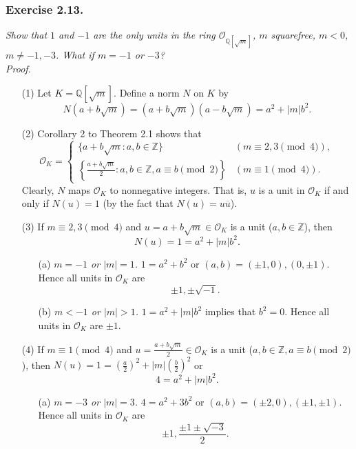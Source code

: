 \documentclass{article}
\begin{document}



\subsubsection*{Exercise 2.13.}
\emph{Show that $1$ and $-1$ are the only units in the ring
$\mathcal{O}_{\mathbb{Q}[\sqrt{m}]}$, $m$ squarefree, $m < 0$,
$m \neq -1, -3$.
What if $m = -1$ or $-3$?} \\

\emph{Proof.}
\begin{enumerate}
\item[(1)]
  Let $K = \mathbb{Q}[\sqrt{m}]$.
  Define a norm $N$ on $K$
  by $$N(a+b\sqrt{m}) = (a+b\sqrt{m})(a-b\sqrt{m}) = a^2 + |m|b^2.$$

\item[(2)]
  Corollary 2 to Theorem 2.1 shows that
  \begin{equation*}
    \mathcal{O}_K =
      \begin{cases}
        \{ a+b\sqrt{m} : a,b \in \mathbb{Z} \}
          & (m \equiv 2,3 \pmod{4}), \\
        \left\{ \frac{a+b\sqrt{m}}{2} : a,b \in \mathbb{Z}, a \equiv b \pmod{2} \right\}
          & (m \equiv 1 \pmod{4}).
      \end{cases}
  \end{equation*}
  Clearly, $N$ maps $\mathcal{O}_K$ to nonnegative integers.
  That is, $u$ is a unit in $\mathcal{O}_K$ if and only if $N(u) = 1$
  (by the fact that $N(u) = u \overline{u}$).

\item[(3)]
  If $m \equiv 2,3 \pmod{4}$ and $u = a + b\sqrt{m} \in \mathcal{O}_K$ is a unit
  ($a, b \in \mathbb{Z}$),
  then $$N(u) = 1 = a^2 + |m|b^2.$$
    \begin{enumerate}
    \item[(a)]
      \emph{$m = -1$ or $|m| = 1$.}
      $1 = a^2 + b^2$ or $(a,b) = (\pm 1,0), (0, \pm 1)$.
      Hence all units in $\mathcal{O}_K$ are
      $$\pm 1, \pm \sqrt{-1}.$$

    \item[(b)]
      \emph{$m < -1$ or $|m| > 1$.}
      $1 = a^2 + |m|b^2$ implies that $b^2 = 0$.
      Hence all units in $\mathcal{O}_K$ are $\pm 1$.
    \end{enumerate}

\item[(4)]
  If $m \equiv 1 \pmod{4}$ and $u = \frac{a + b\sqrt{m}}{2} \in \mathcal{O}_K$ is a unit
  ($a, b \in \mathbb{Z}, a \equiv b \pmod{2}$),
  then $N(u) = 1 = (\frac{a}{2})^2 + |m|(\frac{b}{2})^2$ or
  $$4 = a^2 + |m|b^2.$$
    \begin{enumerate}
    \item[(a)]
      \emph{$m = -3$ or $|m| = 3$.}
      $4 = a^2 + 3b^2$ or $(a,b) = (\pm 2,0), (\pm 1, \pm 1)$.
      Hence all units in $\mathcal{O}_K$ are
      $$\pm 1, \frac{\pm 1 \pm \sqrt{-3}}{2}.$$
    

\end{enumerate}
\end{enumerate}
\end{document}
